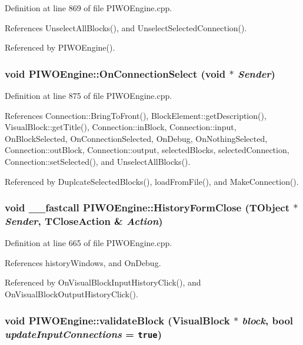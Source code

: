 Definition at line 869 of file PIWOEngine.cpp.

References UnselectAllBlocks(), and UnselectSelectedConnection().

Referenced by PIWOEngine().\hypertarget{classPIWOEngine_1a8f4608620d249e9982004773bf1fe9}{
\subsubsection[OnConnectionSelect]{\setlength{\rightskip}{0pt plus 5cm}void PIWOEngine::OnConnectionSelect (void $\ast$ {\em Sender})}}
\label{classPIWOEngine_1a8f4608620d249e9982004773bf1fe9}




Definition at line 875 of file PIWOEngine.cpp.

References Connection::BringToFront(), BlockElement::getDescription(), VisualBlock::getTitle(), Connection::inBlock, Connection::input, OnBlockSelected, OnConnectionSelected, OnDebug, OnNothingSelected, Connection::outBlock, Connection::output, selectedBlocks, selectedConnection, Connection::setSelected(), and UnselectAllBlocks().

Referenced by DuplcateSelectedBlocks(), loadFromFile(), and MakeConnection().\hypertarget{classPIWOEngine_deb8c8ae4c4d5f69c242f222dc2557bb}{
\subsubsection[HistoryFormClose]{\setlength{\rightskip}{0pt plus 5cm}void \_\-\_\-fastcall PIWOEngine::HistoryFormClose (TObject $\ast$ {\em Sender}, \/  TCloseAction \& {\em Action})}}
\label{classPIWOEngine_deb8c8ae4c4d5f69c242f222dc2557bb}




Definition at line 665 of file PIWOEngine.cpp.

References historyWindows, and OnDebug.

Referenced by OnVisualBlockInputHistoryClick(), and OnVisualBlockOutputHistoryClick().\hypertarget{classPIWOEngine_9e8cffc64037b892fbdb1daf3459a31d}{
\subsubsection[validateBlock]{\setlength{\rightskip}{0pt plus 5cm}void PIWOEngine::validateBlock ({\bf VisualBlock} $\ast$ {\em block}, \/  bool {\em updateInputConnections} = {\tt true})}}
\label{classPIWOEngine_9e8cffc64037b892fbdb1daf3459a31d}




